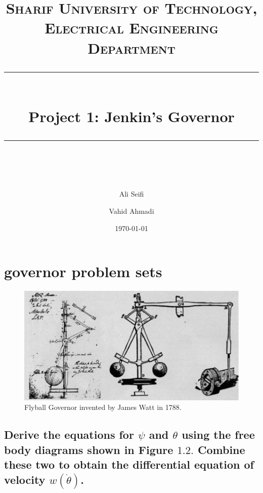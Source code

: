 \documentclass[11pt]{scrartcl} %
\title{	
	\normalfont\normalsize
	\textsc{Sharif University of Technology, Electrical Engineering Department}\\ %
	\vspace{25pt} %
	\rule{\linewidth}{0.5pt}\\ %
	\vspace{20pt} %
	{\huge Project 1: Jenkin’s Governor}\\ %
	\vspace{12pt} %
	\rule{\linewidth}{2pt}\\ %
	\vspace{12pt} %
}
\author{\LARGE Ali Seifi \and \LARGE Vahid Ahmadi}
\date{\normalsize\today} %
\begin{document}
\maketitle %


\section{governor problem sets}

\begin{figure}[h] %
	\centering
	\includegraphics[width=0.7\columnwidth]{images/p1.JPG} %
	\caption{Flyball Governor invented by James Watt in 1788.}
\end{figure}


\subsection{Derive the equations for $\psi$ and $\theta$ using the free body diagrams shown in Figure $1.2 .$ Combine these two to obtain the differential equation of velocity $w(\dot{\theta})$.}
\end{document}
